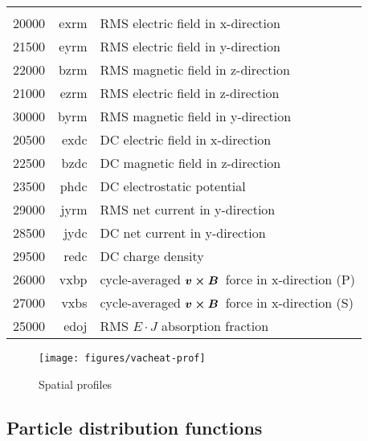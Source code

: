 \documentclass[11pt]{article}
\newcommand{\bm}[1]{\mbox{\boldmath$#1$}}
\newcommand{\vcrossb}{$\bm{v\times B}$}
\begin{document}
\begin{tabular}{rrl}
\hline\\
20000 & exrm& RMS electric field in x-direction \\
21500 & eyrm& RMS electric field in y-direction \\
22000 & bzrm& RMS magnetic field in z-direction \\
21000 & ezrm& RMS electric field in z-direction \\
30000 & byrm& RMS magnetic field in y-direction \\
20500 & exdc& DC electric field in x-direction \\
22500 & bzdc& DC magnetic field in z-direction \\
23500 & phdc& DC electrostatic potential \\
29000 & jyrm& RMS net current in y-direction \\
28500 & jydc& DC net current in y-direction \\
29500 & redc& DC charge density \\
26000 & vxbp& cycle-averaged \vcrossb\ force in x-direction (P)\\
27000 & vxbs& cycle-averaged \vcrossb\ force in x-direction (S)\\
25000 & edoj& RMS \bm{E\cdot J} absorption fraction \\
\end{tabular}

\begin{figure}[ht]
\begin{center}
\texttt{[image: figures/vacheat-prof]}
\caption{Spatial profiles}
\end{center}
\end{figure}

\subsection{Particle distribution functions} 
\end{document}
